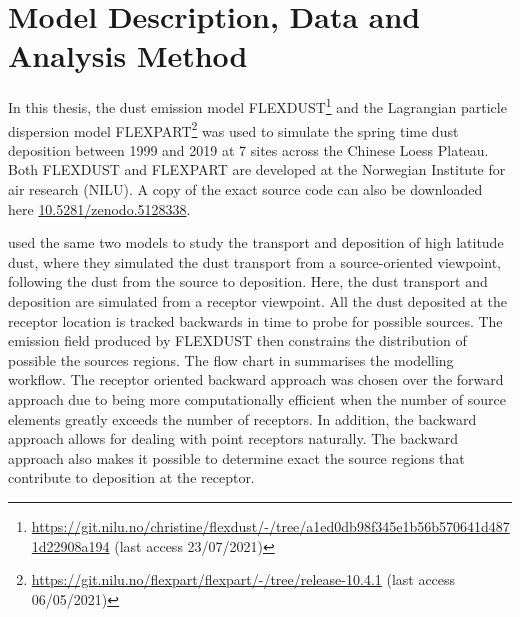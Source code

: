 \chapter{Model Description, Data and Analysis Method} 
In this thesis, the dust emission model 
FLEXDUST\footnote{\url{https://git.nilu.no/christine/flexdust/-/tree/a1ed0db98f345e1b56b570641d4871d22908a194} (last access 23/07/2021)} 
\parencite{flexdust_ref_2016} and the Lagrangian particle dispersion model 
FLEXPART\footnote{ \url{https://git.nilu.no/flexpart/flexpart/-/tree/release-10.4.1} (last access 06/05/2021)} 
\parencite{Flexpart10.4_ref} was used to 
simulate the spring time dust deposition between 1999 and 2019 at 7 sites across the Chinese Loess Plateau. Both FLEXDUST and FLEXPART are developed at the Norwegian Institute for air research (NILU). A copy of the exact source code can also be downloaded here \url{10.5281/zenodo.5128338}. 

\textcite{flexdust_ref_2016} used the same two models to study the transport and deposition of high latitude dust, where they simulated the dust transport from a source-oriented viewpoint, following the dust from the source to deposition. 
Here, the dust transport and deposition are simulated from a receptor viewpoint. 
All the dust deposited at the receptor location is tracked backwards in time to probe for possible sources. 
The emission field produced by FLEXDUST then constrains the distribution of possible the sources regions. 
The flow chart in  summarises the modelling workflow. The receptor oriented backward approach was chosen over the forward approach due to being more computationally efficient when the number of source elements greatly exceeds the number of receptors. 
In addition, the backward approach allows for dealing with point receptors naturally. 
The backward approach also makes it possible to determine exact the source regions that contribute to deposition at the receptor. 

